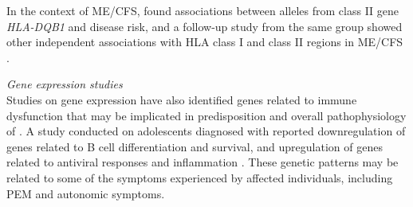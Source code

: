 In the context of ME/CFS, \citet{lande2020HumanLeukocyte} found associations between alleles from class II gene \textit{HLA-DQB1} and disease risk, 
and a follow-up study from the same group showed other independent associations with HLA class I and class II regions in ME/CFS \citep{hajdarevic2021FineMapping}.


\bsni
\textit{Gene expression studies}\\
\noindent
Studies on gene expression 
have also identified genes related to immune dysfunction that may be implicated in predisposition and overall pathophysiology of \cfs \citep{vernon2002UtilityBlood}.
A study conducted on adolescents diagnosed with \cfs reported downregulation of genes related to B cell differentiation and survival, and upregulation of genes related to antiviral responses and inflammation \citep{nguyen2017WholeBlood}.
These genetic patterns may be related to some of the symptoms experienced by affected individuals, including PEM and autonomic symptoms.


